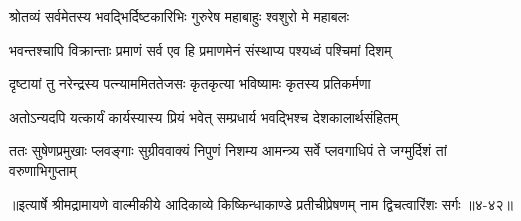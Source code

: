 \twolineshloka
{श्रोतव्यं सर्वमेतस्य भवद्भिर्दिष्टकारिभिः}
{गुरुरेष महाबाहुः श्वशुरो मे महाबलः} %

\twolineshloka
{भवन्तश्चापि विक्रान्ताः प्रमाणं सर्व एव हि}
{प्रमाणमेनं संस्थाप्य पश्यध्वं पश्चिमां दिशम्} %

\twolineshloka
{दृष्टायां तु नरेन्द्रस्य पत्न्याममिततेजसः}
{कृतकृत्या भविष्यामः कृतस्य प्रतिकर्मणा} %

\twolineshloka
{अतोऽन्यदपि यत्कार्यं कार्यस्यास्य प्रियं भवेत्}
{सम्प्रधार्य भवद्भिश्च देशकालार्थसंहितम्} %

\twolineshloka
{ततः सुषेणप्रमुखाः प्लवङ्गाः सुग्रीववाक्यं निपुणं निशम्य}
{आमन्त्र्य सर्वे प्लवगाधिपं ते जग्मुर्दिशं तां वरुणाभिगुप्ताम्} %


॥इत्यार्षे श्रीमद्रामायणे वाल्मीकीये आदिकाव्ये किष्किन्धाकाण्डे प्रतीचीप्रेषणम् नाम द्विचत्वारिंशः सर्गः ॥४-४२॥
